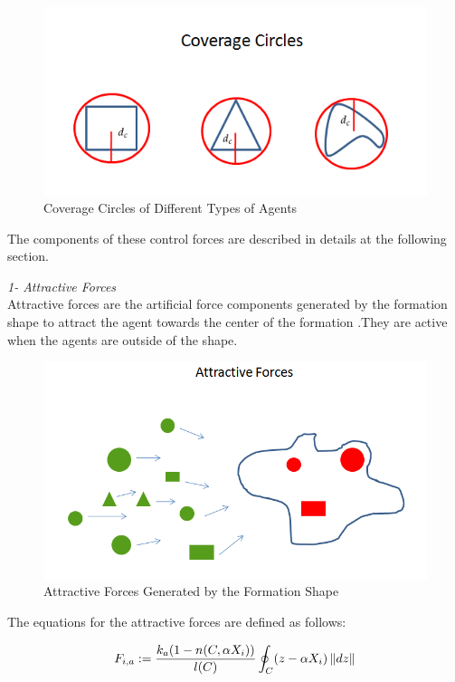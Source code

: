 \begin{figure}[H]
\caption{Coverage Circles of Different Types of Agents}
\centering
\includegraphics[scale = 0.60]{coverage_circles}
\end{figure}
		
The components of these  control forces are described in details at the following section. \newline

\textit{			1- Attractive Forces} \\ 
Attractive forces are the artificial force components generated by the formation shape to attract the agent towards the center of the formation .They are active when the agents are outside of the shape. 

\begin{figure}[H]
\caption{Attractive Forces Generated by the Formation Shape}
\centering
\includegraphics[scale = 0.60]{attractive_forces}
\end{figure}	

The equations for the attractive forces are defined as follows:			

\begin{equation}
F_{i,a} := \frac{k_a (1-n(C,\alpha X_i))}{l(C)} \oint_C(z-\alpha X_i)\left\lVert dz\right\rVert
\end{equation}

